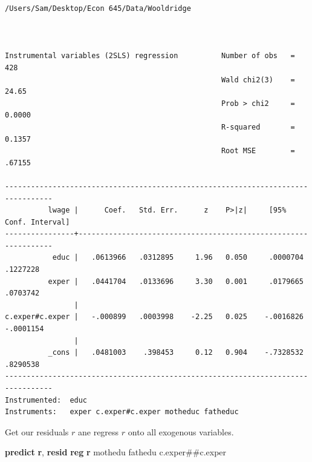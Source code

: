 \documentclass[
]{book}
\newenvironment{Shaded}{\begin{snugshade}}{\end{snugshade}}
\newcommand{\FunctionTok}[1]{\textcolor[rgb]{0.13,0.29,0.53}{\textbf{#1}}}
\newcommand{\KeywordTok}[1]{\textcolor[rgb]{0.13,0.29,0.53}{\textbf{#1}}}
\newcommand{\NormalTok}[1]{#1}
\begin{document}
\begin{verbatim}
/Users/Sam/Desktop/Econ 645/Data/Wooldridge



Instrumental variables (2SLS) regression          Number of obs   =        428
                                                  Wald chi2(3)    =      24.65
                                                  Prob > chi2     =     0.0000
                                                  R-squared       =     0.1357
                                                  Root MSE        =     .67155

---------------------------------------------------------------------------------
          lwage |      Coef.   Std. Err.      z    P>|z|     [95% Conf. Interval]
----------------+----------------------------------------------------------------
           educ |   .0613966   .0312895     1.96   0.050     .0000704    .1227228
          exper |   .0441704   .0133696     3.30   0.001     .0179665    .0703742
                |
c.exper#c.exper |   -.000899   .0003998    -2.25   0.025    -.0016826   -.0001154
                |
          _cons |   .0481003    .398453     0.12   0.904    -.7328532    .8290538
---------------------------------------------------------------------------------
Instrumented:  educ
Instruments:   exper c.exper#c.exper motheduc fatheduc
\end{verbatim}

Get our residuals \(r\) ane regress \(r\) onto all exogenous variables.

\begin{Shaded}
\begin{Highlighting}[]
\KeywordTok{predict} \FunctionTok{r}\NormalTok{, }\KeywordTok{resid}
\KeywordTok{reg} \FunctionTok{r}\NormalTok{ mothedu fathedu c.exper\#\#c.exper}
\end{Highlighting}
\end{Shaded}
\end{document}
